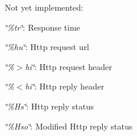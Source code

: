 Not yet implemented:\par
 {\itshape \char`\"{}\%tr\char`\"{}\/}: Response time \par
 {\itshape \char`\"{}\%hu\char`\"{}\/}: Http request url \par
 {\itshape \char`\"{}\%$>$hi\char`\"{}\/}: Http request header \par
 {\itshape \char`\"{}\%$<$hi\char`\"{}\/}: Http reply header \par
 {\itshape \char`\"{}\%Hs\char`\"{}\/}: Http reply status \par
 {\itshape \char`\"{}\%Hso\char`\"{}\/}: Modified Http reply status \par
 
